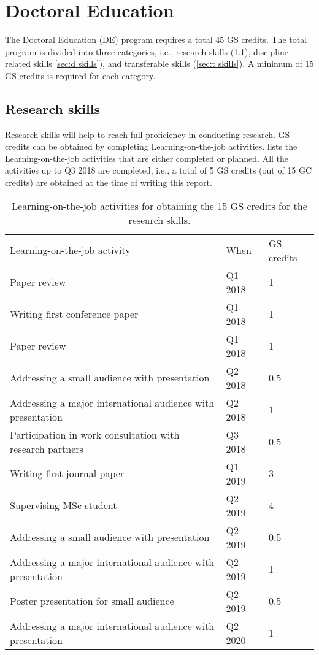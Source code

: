 \section{Doctoral Education}
\label{sec:de}

The Doctoral Education (DE) program requires a total 45 GS credits. The total program is divided into three categories, i.e., research skills (\cref{sec:r skills}), discipline-related skills \cref{sec:d skills}), and transferable skills (\cref{sec:t skills}). A minimum of 15 GS credits is required for each category.

\subsection{Research skills}
\label{sec:r skills}

Research skills will help to reach full proficiency in conducting research. GS credits can be obtained by completing Learning-on-the-job activities.  lists the Learning-on-the-job activities that are either completed or planned. All the activities up to Q3 2018 are completed, i.e., a total of 5 GS credits (out of 15 GC credits) are obtained at the time of writing this report.

\begin{table}[b]
	\centering
	\caption{Learning-on-the-job activities for obtaining the 15 GS credits for the research skills.}
	\label{tab:research skills}
	\begin{tabular}{lll}
		\toprule
		Learning-on-the-job activity & When & GS credits \\ \otoprule
		Paper review & Q1 2018 & 1 \\
		Writing first conference paper & Q1 2018 & 1 \\
		Paper review & Q1 2018 & 1 \\
		Addressing a small audience with presentation & Q2 2018 & 0.5 \\
		Addressing a major international audience with presentation & Q2 2018 & 1 \\
		Participation in work consultation with research partners & Q3 2018 & 0.5 \\
		Writing first journal paper & Q1 2019 & 3 \\
		Supervising MSc student & Q2 2019 & 4 \\
		Addressing a small audience with presentation & Q2 2019 & 0.5 \\
		Addressing a major international audience with presentation & Q2 2019 & 1 \\
		Poster presentation for small audience & Q2 2019 & 0.5 \\
		Addressing a major international audience with presentation & Q2 2020 & 1 \\
		\bottomrule
	\end{tabular}
\end{table}

